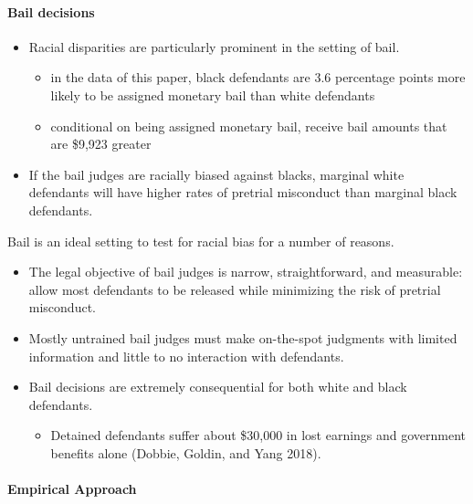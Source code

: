 \documentclass[../root]{subfiles}
\begin{document}
    \paragraph{Bail decisions}

    \begin{itemize}
      \item Racial disparities are particularly prominent in the setting of bail.
      \begin{itemize}
        \item in the data of this paper, black defendants are 3.6 percentage points more likely to be assigned monetary bail than white defendants
        \item conditional on being assigned monetary bail, receive bail amounts that are \$9,923 greater
      \end{itemize}
      \item If the bail judges are racially biased against blacks, marginal white defendants will have higher rates of pretrial misconduct than marginal black defendants.
    \end{itemize}

    Bail is an ideal setting to test for racial bias for a number of reasons.

    \begin{itemize}
      \item The legal  objective of bail judges is narrow, straightforward, and measurable: allow most defendants to be released while minimizing the risk of pretrial misconduct.
      \item Mostly untrained bail judges must make on-the-spot judgments with limited information and little to no interaction with defendants.
      \item Bail decisions are extremely consequential for both white and black defendants.
      \begin{itemize}
        \item Detained defendants suffer about \$30,000 in lost earnings and government benefits alone (Dobbie, Goldin, and Yang 2018).
      \end{itemize}
    \end{itemize}

    \paragraph{Empirical Approach}
\end{document}
